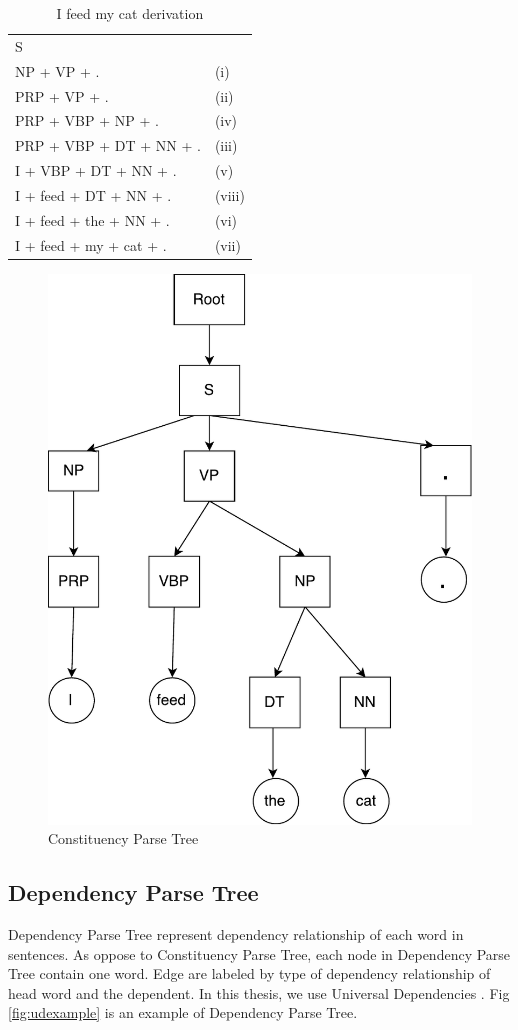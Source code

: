 \begin{table}[H]
	\centering
	\begin{tabular}{ll}
	S	&  \\
	NP + VP + .	& (i) \\
	PRP + VP + .	& (ii) \\
	PRP + VBP + NP + .	& (iv)  \\
	PRP + VBP + DT + NN + .	& (iii) \\
	I + VBP + DT + NN + .	&  (v) \\
	I + feed + DT + NN + .	&  (viii) \\
	I + feed + the + NN + .	&  (vi) \\
	I + feed + my + cat + .	& (vii)
	\end{tabular}
\caption{I feed my cat derivation}
\label{ifeedmycat}
\end{table}

\begin{figure}[H]
	\centering
	\includegraphics[width=0.5\linewidth]{figure/ifeedthecatconstituency}
	\caption[Constituency Parse Tree]{Constituency Parse Tree}
	\label{fig:ifeedthecatconstituency}
\end{figure}

\subsection{Dependency Parse Tree}
Dependency Parse Tree represent dependency relationship of each word in sentences. As oppose to Constituency Parse Tree, each node in Dependency Parse Tree contain one word. Edge are labeled by type of dependency relationship of head word and the dependent. In this thesis, we use Universal Dependencies \cite{nivre2016universal}. Fig \ref{fig:udexample} is an example of Dependency Parse Tree.

